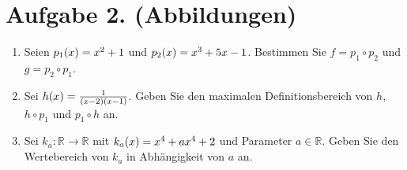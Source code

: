 \documentclass[german,12pt]{homework}
\newcommand{\RR}{\mathbb{R}}
\DeclarePairedDelimiter{\enbrace}{(}{)}
\begin{document}
    \section*{Aufgabe 2. (Abbildungen)}

    \begin{problem}
        \begin{enumerate}
            \item Seien \(p_1\enbrace*{x} = x^2 + 1\) und \(p_2\enbrace*{x} = x^3 + 5x - 1\). Bestimmen Sie \(f = p_1 \circ p_2\) und \(g = p_2 \circ p_1\).
            \item Sei \(h\enbrace*{x} = \frac{1}{\enbrace*{x - 2}\enbrace*{x - 1}}\). Geben Sie den maximalen Definitionsbereich von \(h\), \(h \circ p_1\) und \(p_1 \circ h\) an.
            \item Sei \(k_a: \RR \to \RR\) mit \(k_a\enbrace*{x} = x^4 + ax^4 + 2\) und Parameter \(a \in \RR\). Geben Sie den Wertebereich von \(k_a\) in Abhängigkeit von \(a\) an.
        \end{enumerate}
    \end{problem}
\end{document}
